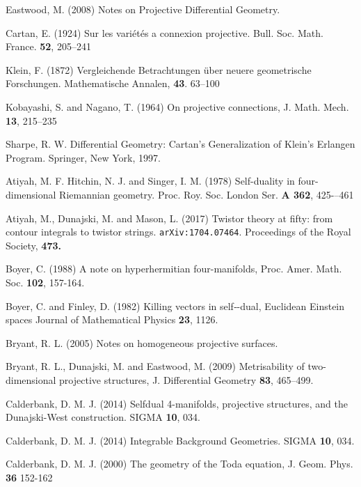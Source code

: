 
\begin{thebibliography}{}

 Eastwood, M. (2008)
Notes on Projective Differential Geometry.

 Cartan, E. (1924)
Sur les vari\'et\'es a connexion projective.
Bull. Soc. Math. France. {\bf 52}, 205--241

 Klein, F. (1872)
Vergleichende Betrachtungen \"uber neuere geometrische Forschungen. Mathematische Annalen, {\bf 43}. 63--100

 Kobayashi, S. and Nagano, T. (1964)
On projective connections, J. Math. Mech. {\bf 13}, 215--235

 Sharpe, R. W.
Differential Geometry: Cartan's Generalization of Klein's Erlangen Program. Springer, New York, 1997.

Atiyah, M. F.  Hitchin, N. J. and  
Singer, I. M. (1978) 
 Self-duality in four-dimensional Riemannian geometry. Proc. Roy. Soc. London Ser. {\bf A 362},  425-–461

Atiyah, M., Dunajski, M. and Mason, L. (2017) Twistor theory at fifty: from contour integrals to twistor strings. 
{\tt arXiv:1704.07464}. Proceedings of the Royal Society, {\bf 473.}


 Boyer, C. (1988) A note on hyperhermitian four-manifolds, Proc. Amer. Math. Soc. {\bf 102},
157-164.

 Boyer, C. and Finley, D. (1982)
Killing vectors in self‐-dual, Euclidean Einstein spaces
Journal of Mathematical Physics {\bf 23}, 1126.

  Bryant, R. L. (2005)
Notes on homogeneous projective surfaces.

 Bryant, R. L., Dunajski, M. and Eastwood, M.
 (2009)  Metrisability of two-dimensional projective structures,
J. Differential Geometry {\bf 83}, 465--499.


 Calderbank, D. M. J. (2014)
Selfdual 4-manifolds, projective structures, and the Dunajski-West construction. SIGMA {\bf 10}, 034.

 Calderbank, D. M. J. (2014)
Integrable Background Geometries. SIGMA {\bf 10}, 034.

 Calderbank, D. M. J. (2000) The geometry of the Toda 
equation, J. Geom. Phys. {\bf 36}  152-162



\end{thebibliography}
